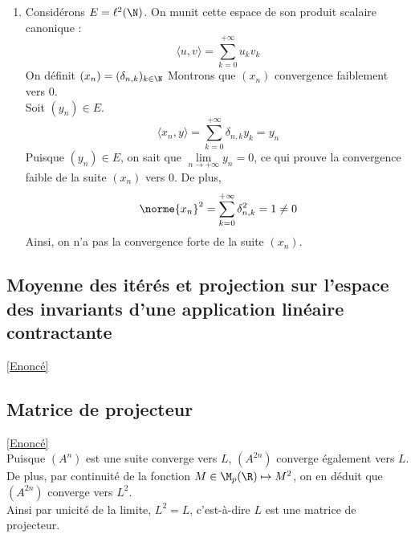 \documentclass{book}
\begin{document}
\begin{enumerate}
			On prend $(e_i)_{i\in\crblanc{1}{d}}$ une base orthonormale de $E$.\\
			Soit $(x_n)\in E^\N$ convergent faiblement vers $x\in E$. 
			Ainsi \[\norme{x_n-x}^2=\sum_{i=1}^{n}\langle x_n-x,e_i\rangle^2\]
			On en déduit donc que \[\lim\limits_{n\to+\infty}\norme{x_n-x}^2=0\]
			d'où le résultat.
			\item Considérons $E=\ell^2(\N)$. On munit cette espace de son produit scalaire canonique : 
			\[\langle u,v\rangle=\sum_{k=0}^{+\infty}u_kv_k\]
			On définit $(x_n)=(\delta_{n,k})_{k\in\N}$
			Montrons que $(x_n)$ convergence faiblement vers $0$.\\
			Soit $(y_n)\in E$. 
			\[\langle x_n,y\rangle=\sum_{k=0}^{+\infty}\delta_{n,k}y_k=y_n\]
			Puisque $(y_n)\in E$, on sait que $\lim\limits_{n\to+\infty}y_n=0$, ce qui prouve la convergence faible de la suite $(x_n)$ vers $0$.
			De plus, \[\norme{x_n}^2=\sum_{k=0}^{+\infty}\delta_{n,k}^2=1\ne 0\]
			Ainsi, on n'a pas la convergence forte de la suite $(x_n)$.
		\end{enumerate}
	\subsection{Moyenne des itérés et projection sur l'espace des invariants d'une application linéaire contractante}\label{sec:moyenne-des-iteres-et-projection-sur-lespace-des-invariants-dune-application-lineaire-contractante}
		\textcolor{blue}{\hyperref[Moyenne des itérés et projection sur l'espace des invariants d'une application linéaire contractante]{[Enoncé]}}\\
	\subsection{Matrice de projecteur}\label{sec:matrice-de-projecteur}
		\textcolor{blue}{\hyperref[Matrice de projecteur]{[Enoncé]}}\\
		Puisque $(A^n)$ est une suite converge vers $L$, $(A^{2n})$ converge également vers $L$.\\
		De plus, par continuité de la fonction $M\in\M_p(\R)\mapsto M^2$, on en déduit que $(A^{2n})$ converge vers $L^2$.\\
		Ainsi par unicité de la limite, $L^2=L$, c'est-à-dire $L$ est une matrice de projecteur.
\end{document}
